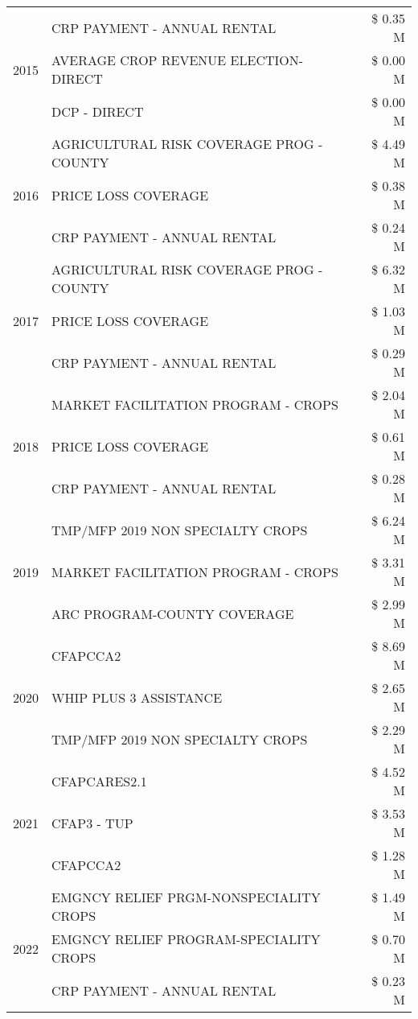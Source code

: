 \begin{tabular}{llr}
\cline{1-3}
\multirow[t]{3}{*}{2015} & CRP PAYMENT - ANNUAL RENTAL & \$ 0.35 M \\
 & AVERAGE CROP REVENUE ELECTION-DIRECT & \$ 0.00 M \\
 & DCP - DIRECT & \$ 0.00 M \\
\cline{1-3}
\multirow[t]{3}{*}{2016} & AGRICULTURAL RISK COVERAGE PROG - COUNTY & \$ 4.49 M \\
 & PRICE LOSS COVERAGE & \$ 0.38 M \\
 & CRP PAYMENT - ANNUAL RENTAL & \$ 0.24 M \\
\cline{1-3}
\multirow[t]{3}{*}{2017} & AGRICULTURAL RISK COVERAGE PROG - COUNTY & \$ 6.32 M \\
 & PRICE LOSS COVERAGE & \$ 1.03 M \\
 & CRP PAYMENT - ANNUAL RENTAL & \$ 0.29 M \\
\cline{1-3}
\multirow[t]{3}{*}{2018} & MARKET FACILITATION PROGRAM - CROPS & \$ 2.04 M \\
 & PRICE LOSS COVERAGE & \$ 0.61 M \\
 & CRP PAYMENT - ANNUAL RENTAL & \$ 0.28 M \\
\cline{1-3}
\multirow[t]{3}{*}{2019} & TMP/MFP 2019 NON SPECIALTY CROPS & \$ 6.24 M \\
 & MARKET FACILITATION PROGRAM - CROPS & \$ 3.31 M \\
 & ARC PROGRAM-COUNTY COVERAGE & \$ 2.99 M \\
\cline{1-3}
\multirow[t]{3}{*}{2020} & CFAPCCA2 & \$ 8.69 M \\
 & WHIP PLUS 3 ASSISTANCE & \$ 2.65 M \\
 & TMP/MFP 2019 NON SPECIALTY CROPS & \$ 2.29 M \\
\cline{1-3}
\multirow[t]{3}{*}{2021} & CFAPCARES2.1 & \$ 4.52 M \\
 & CFAP3 - TUP & \$ 3.53 M \\
 & CFAPCCA2 & \$ 1.28 M \\
\cline{1-3}
\multirow[t]{3}{*}{2022} & EMGNCY RELIEF PRGM-NONSPECIALITY CROPS & \$ 1.49 M \\
 & EMGNCY RELIEF PROGRAM-SPECIALITY CROPS & \$ 0.70 M \\
 & CRP PAYMENT - ANNUAL RENTAL & \$ 0.23 M \\
\cline{1-3}
\bottomrule
\end{tabular}
